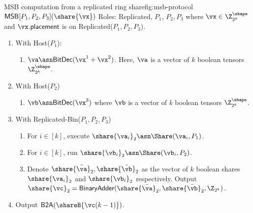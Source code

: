 \begin{Boxfig}{MSB computation from a replicated ring share}{fig:msb-protocol}
  {$\mathsf{MSB}[P_1, P_2, P_3](\share{\vx})$}
  Roles: Replicated, $P_1$, $P_2, P_3$ where $\vx \in \Z_{2^k}^\shape$ and
  $\vx.\mathsf{placement}$ is on Replicated($P_1, P_2, P_3$).
  \begin{enumerate}
  \item With Host($P_1$):
  \begin{enumerate}
    \item $\va \asn \textsf{BitDec}(\vx^1 + \vx^2)$. Here, $\va$ is a vector of $k$ boolean tensors $\Z_{2^k}^\shape$.
  \end{enumerate}
  \item With Host($P_2$)
  \begin{enumerate}
    \item $\vb \asn \textsf{BitDec}(\vx^3)$ where $\vb$ is a vector of $k$ boolean tensors $\Z_{2^k}^\shape$.
  \end{enumerate}
  \item With Replicated-Bin($P_1, P_2, P_3$)
  \begin{enumerate}
    \item For $i \in [k]$, execute $\share{\va_i}_2 \asn \Share(\va_i, P_1)$.
    \item For $i \in [k]$, run $\share{\vb_i}_2 \asn \Share(\vb_i,
    P_2)$.  
    \item Denote $\share{\bar{\va}}_2,
    \share{\bar{\vb}}_2$ as the vector of $k$ boolean shares
    $\share{\va_i}_2$ and $\share{\vb_i}_2$ respectively. Output $\share{\vc}_2 = \textsf{BinaryAdder}(\share{\bar{\va}}_2, \share{\bar{\vb}}_2, \Z_{2^k})$.
  \end{enumerate}
  \item Output $\textsf{B2A}(\shareB{\vc(k-1)})$.
\end{enumerate}

\end{Boxfig}


